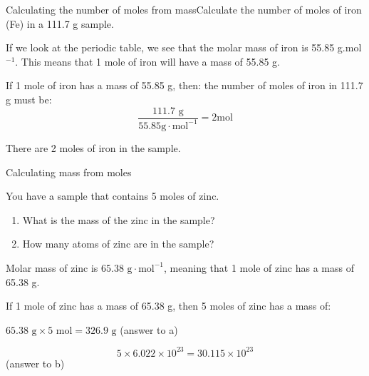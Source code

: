 \begin{wex}{Calculating the number of moles from mass}{Calculate the number of moles of iron (Fe) in a 111.7 g sample.\\}

{
If we look at the periodic table, we see that the molar mass of iron is 55.85 g.mol$^{-1}$. This means that 1 mole of iron will have a mass of 55.85 g.\\
}

{
If 1 mole of iron has a mass of 55.85 g, then: the number of moles of iron in 111.7 g must be:
\begin{equation*}
\frac{111.7 \text{ g}}{55.85 \text{g} \cdot \text{mol}^{-1}} = 2 \text{mol}
\end{equation*}

There are 2 moles of iron in the sample.
}
\end{wex}

\begin{wex}{Calculating mass from moles}{You have a sample that contains 5 moles of zinc.

\begin{enumerate}
\item{What is the mass of the zinc in the sample?}
\item{How many atoms of zinc are in the sample?}
\end{enumerate}
}

{
Molar mass of zinc is $65.38 \text{ g} \cdot \text{mol}^{-1}$, meaning that 1 mole of zinc has a mass of 65.38 g.
}\\

{
If 1 mole of zinc has a mass of 65.38 g, then 5 moles of zinc has a mass of:
\begin{center}
$65.38 \text{ g} \times 5 \text{ mol} = 326.9 \text{ g}$ (answer to a)
\end{center}
}
{
\begin{equation*}
5 \times 6.022 \times 10^{23} = 30.115 \times 10^{23}
\end{equation*}
(answer to b) }
\end{wex}

